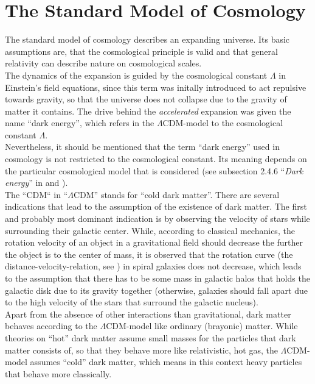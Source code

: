 \chapter{The Standard Model of Cosmology}
\label{chap:the-standard-model-of-cosmology}
\thispagestyle{empty}

\noindent The standard model of cosmology describes an expanding universe. Its basic assumptions are, that the cosmological principle is valid and that general relativity can describe nature on cosmological scales. \\

\noindent The dynamics of the expansion is guided by the cosmological constant $\Lambda$ in Einstein's field equations, since this term was initally introduced to act repulsive towards gravity, so that the universe does not collapse due to the gravity of matter it contains. The drive behind the \textit{accelerated} expansion was given the name ``dark energy'', which refers in the $\Lambda$CDM-model to the cosmological constant $\Lambda$. \\ 
Nevertheless, it should be mentioned that the term ``dark energy'' used in cosmology is not restricted to the cosmological constant. Its meaning depends on the particular cosmological model that is considered (see subsection 2.4.6 ``\textit{Dark energy}'' in \cite[p.~50]{Dodelson2020} and \cite{Frieman2008}). \\

\noindent The ``CDM`` in ``$\Lambda$CDM'' stands for ``cold dark matter''. There are several indications that lead to the assumption of the existence of dark matter. The first and probably most dominant indication is by observing the velocity of stars while surrounding their galactic center. While, according to classical mechanics, the rotation velocity of an object in a gravitational field should decrease the further the object is to the center of mass, it is observed that the rotation curve (the distance-velocity-relation, see \cite[p. 64]{Schneider2006}) in spiral galaxies does not decrease, which leads to the assumption that there has to be some mass in galactic halos that holds the galactic disk due to its gravity together (otherwise, galaxies should fall apart due to the high velocity of the stars that surround the galactic nucleus). \\
Apart from the absence of other interactions than gravitational, dark matter behaves according to the $\Lambda$CDM-model like ordinary (brayonic) matter. While theories on ``hot'' dark matter assume small masses for the particles that dark matter consists of, so that they behave more like relativistic, hot gas, the $\Lambda$CDM-model assumes ``cold'' dark matter, which means in this context heavy particles that behave more classically. \\

